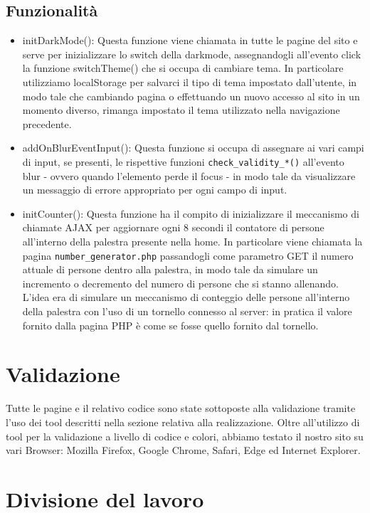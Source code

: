 \documentclass[a4paper]{article}
\begin{document}
	\subsection{Funzionalità}
	\begin{itemize}
		\item initDarkMode(): Questa funzione viene chiamata in tutte le pagine del sito e serve per inizializzare lo switch della darkmode, assegnandogli all'evento click la funzione switchTheme() che si occupa di cambiare tema. In particolare utilizziamo localStorage per salvarci il tipo di tema impostato dall'utente, in modo tale che cambiando pagina o effettuando un nuovo accesso al sito in un momento diverso, rimanga impostato il tema utilizzato nella navigazione precedente.
		\item addOnBlurEventInput(): Questa funzione si occupa di assegnare ai vari campi di input, se presenti, le rispettive funzioni \texttt{check\_validity\_*()} all'evento blur - ovvero quando l'elemento perde il focus - in modo tale da visualizzare un messaggio di errore appropriato per ogni campo di input.
		\item initCounter(): Questa funzione ha il compito di inizializzare il meccanismo di chiamate AJAX per aggiornare ogni 8 secondi il contatore di persone all'interno della palestra presente nella home. In particolare viene chiamata la pagina \texttt{number\_generator.php} passandogli come parametro GET il numero attuale di persone dentro alla palestra, in modo tale da simulare un incremento o decremento del numero di persone che si stanno allenando. L'idea era di simulare un meccanismo di conteggio delle persone all'interno della palestra con l'uso di un tornello connesso al server: in pratica il valore fornito dalla pagina PHP è come se fosse quello fornito dal tornello.
	\end{itemize}

	\section{Validazione}
	Tutte le  pagine e il relativo codice sono state sottoposte alla validazione tramite l'uso dei tool descritti nella sezione relativa alla realizzazione. Oltre all'utilizzo di tool per la validazione a livello di codice e colori, abbiamo testato il nostro sito su vari Browser: Mozilla Firefox, Google Chrome, Safari, Edge ed Internet Explorer.

	\section{Divisione del lavoro}
\end{document}
